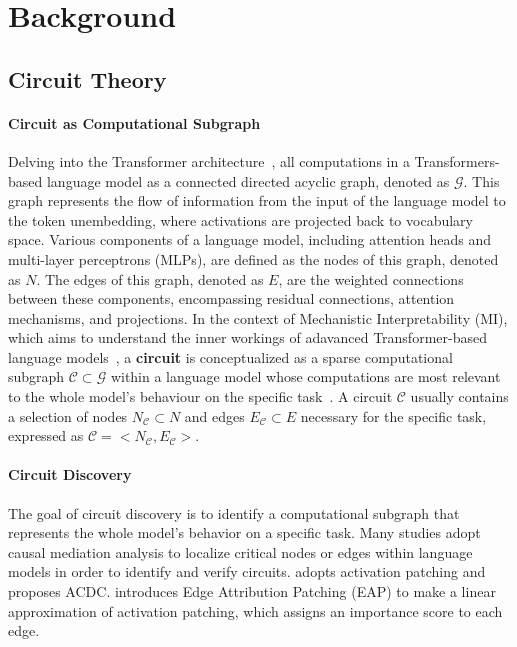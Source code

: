 \section{Background}

\subsection{Circuit Theory}

\paragraph{Circuit as Computational Subgraph}
Delving into the Transformer architecture~\citep{transformer}, all computations in a Transformers-based language model as a connected directed acyclic graph, denoted as $\mathcal{G}$.
This graph represents the flow of information from the input of the language model to the token unembedding, where activations are projected back to vocabulary space.
Various components of a language model, including attention heads and multi-layer perceptrons (MLPs), are defined as the nodes of this graph, denoted as $N$.
The edges of this graph, denoted as $E$, are the weighted connections between these components, encompassing residual connections, attention mechanisms, and projections.
In the context of Mechanistic Interpretability (MI), which aims to understand the inner workings of adavanced Transformer-based language models~\citep{mi_review,mi_primer,mi_safety_review,sharkey2025open}, a \textbf{circuit} is conceptualized as a sparse computational subgraph $\mathcal{C}\subset\mathcal{G}$ within a language model whose computations are most relevant to the whole model's behaviour on the specific task~\citep{zoom_in,transformer_circuits,interpretability_in_the_wild,sparse_feature_circuits}.
A circuit $\mathcal{C}$ usually contains a selection of nodes $N_{\mathcal{C}}\subset{N}$ and edges $E_{\mathcal{C}}\subset{E}$ necessary for the specific task, expressed as $\mathcal{C}=<N_{\mathcal{C}},E_{\mathcal{C}}>$.

\paragraph{Circuit Discovery}
The goal of circuit discovery is to identify a computational subgraph that represents the whole model's behavior on a specific task.
Many studies adopt causal mediation analysis to localize critical nodes or edges within language models in order to identify and verify circuits.
\citet{acdc} adopts activation patching and proposes ACDC.
\citet{eap} introduces Edge Attribution Patching (EAP) to make a linear approximation of
activation patching, which assigns an importance score to each edge.

